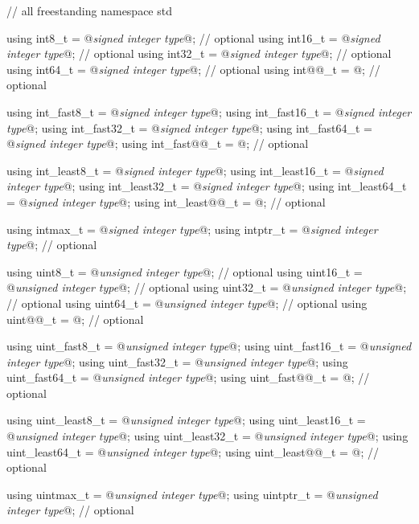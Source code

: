 \begin{codeblock}
// all freestanding
namespace std {
  using int8_t         = @\textit{signed integer type}@;   // optional
  using int16_t        = @\textit{signed integer type}@;   // optional
  using int32_t        = @\textit{signed integer type}@;   // optional
  using int64_t        = @\textit{signed integer type}@;   // optional
  using int@@_t         = @\seebelow@;             // optional

  using int_fast8_t    = @\textit{signed integer type}@;
  using int_fast16_t   = @\textit{signed integer type}@;
  using int_fast32_t   = @\textit{signed integer type}@;
  using int_fast64_t   = @\textit{signed integer type}@;
  using int_fast@@_t    = @\seebelow@;             // optional

  using int_least8_t   = @\textit{signed integer type}@;
  using int_least16_t  = @\textit{signed integer type}@;
  using int_least32_t  = @\textit{signed integer type}@;
  using int_least64_t  = @\textit{signed integer type}@;
  using int_least@@_t   = @\seebelow@;             // optional

  using intmax_t       = @\textit{signed integer type}@;
  using intptr_t       = @\textit{signed integer type}@;   // optional

  using uint8_t        = @\textit{unsigned integer type}@; // optional
  using uint16_t       = @\textit{unsigned integer type}@; // optional
  using uint32_t       = @\textit{unsigned integer type}@; // optional
  using uint64_t       = @\textit{unsigned integer type}@; // optional
  using uint@@_t        = @\seebelow@;             // optional

  using uint_fast8_t   = @\textit{unsigned integer type}@;
  using uint_fast16_t  = @\textit{unsigned integer type}@;
  using uint_fast32_t  = @\textit{unsigned integer type}@;
  using uint_fast64_t  = @\textit{unsigned integer type}@;
  using uint_fast@@_t   = @\seebelow@;             // optional

  using uint_least8_t  = @\textit{unsigned integer type}@;
  using uint_least16_t = @\textit{unsigned integer type}@;
  using uint_least32_t = @\textit{unsigned integer type}@;
  using uint_least64_t = @\textit{unsigned integer type}@;
  using uint_least@@_t  = @\seebelow@;             // optional

  using uintmax_t      = @\textit{unsigned integer type}@;
  using uintptr_t      = @\textit{unsigned integer type}@; // optional
}


\end{codeblock}
